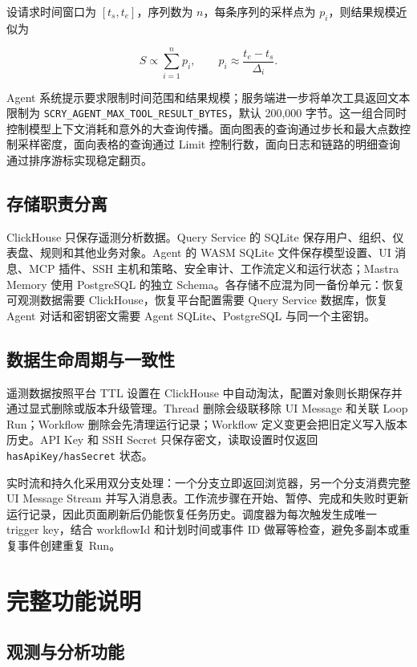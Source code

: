 \documentclass[conference,10pt]{IEEEtran}
\newcommand{\code}[1]{\texttt{#1}}
\begin{document}
设请求时间窗口为 $[t_s,t_e]$，序列数为 $n$，每条序列的采样点为 $p_i$，则结果规模近似为

\begin{equation}
  S \propto \sum_{i=1}^{n}p_i, \qquad p_i \approx \frac{t_e-t_s}{\Delta_i}.
\end{equation}

Agent 系统提示要求限制时间范围和结果规模；服务端进一步将单次工具返回文本限制为 \code{SCRY\_AGENT\_MAX\_TOOL\_RESULT\_BYTES}，默认 200,000 字节。这一组合同时控制模型上下文消耗和意外的大查询传播。面向图表的查询通过步长和最大点数控制采样密度，面向表格的查询通过 Limit 控制行数，面向日志和链路的明细查询通过排序游标实现稳定翻页。

\subsection{存储职责分离}

ClickHouse 只保存遥测分析数据。Query Service 的 SQLite 保存用户、组织、仪表盘、规则和其他业务对象。Agent 的 WASM SQLite 文件保存模型设置、UI 消息、MCP 插件、SSH 主机和策略、安全审计、工作流定义和运行状态；Mastra Memory 使用 PostgreSQL 的独立 Schema。各存储不应混为同一备份单元：恢复可观测数据需要 ClickHouse，恢复平台配置需要 Query Service 数据库，恢复 Agent 对话和密钥密文需要 Agent SQLite、PostgreSQL 与同一个主密钥。

\subsection{数据生命周期与一致性}

遥测数据按照平台 TTL 设置在 ClickHouse 中自动淘汰，配置对象则长期保存并通过显式删除或版本升级管理。Thread 删除会级联移除 UI Message 和关联 Loop Run；Workflow 删除会先清理运行记录；Workflow 定义变更会把旧定义写入版本历史。API Key 和 SSH Secret 只保存密文，读取设置时仅返回 \code{hasApiKey/hasSecret} 状态。

实时流和持久化采用双分支处理：一个分支立即返回浏览器，另一个分支消费完整 UI Message Stream 并写入消息表。工作流步骤在开始、暂停、完成和失败时更新运行记录，因此页面刷新后仍能恢复任务历史。调度器为每次触发生成唯一 trigger key，结合 workflowId 和计划时间或事件 ID 做幂等检查，避免多副本或重复事件创建重复 Run。

\section{完整功能说明}

\subsection{观测与分析功能}
\end{document}
